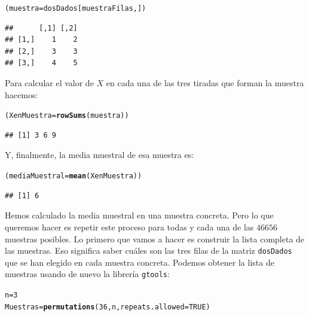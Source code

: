 \documentclass[10pt,a4paper]{article}\usepackage[]{graphicx}\usepackage[]{color}
\makeatletter
\newcommand{\hlnum}[1]{\textcolor[rgb]{0.686,0.059,0.569}{#1}}%
\newcommand{\hlstd}[1]{\textcolor[rgb]{0.345,0.345,0.345}{#1}}%
\newcommand{\hlkwb}[1]{\textcolor[rgb]{0.69,0.353,0.396}{#1}}%
\newcommand{\hlkwc}[1]{\textcolor[rgb]{0.333,0.667,0.333}{#1}}%
\newcommand{\hlkwd}[1]{\textcolor[rgb]{0.737,0.353,0.396}{\textbf{#1}}}%
\newenvironment{kframe}{%
 \def\at@end@of@kframe{}%
 \ifinner\ifhmode%
  \def\at@end@of@kframe{\end{minipage}}%
  \begin{minipage}{\columnwidth}%
 \fi\fi%
 \def\FrameCommand##1{\hskip\@totalleftmargin \hskip-\fboxsep
 \colorbox{shadecolor}{##1}\hskip-\fboxsep
     \hskip-\linewidth \hskip-\@totalleftmargin \hskip\columnwidth}%
 \MakeFramed {\advance\hsize-\width
   \@totalleftmargin\z@ \linewidth\hsize
   \@setminipage}}%
 {\par\unskip\endMakeFramed%
 \at@end@of@kframe}
\newenvironment{knitrout}{}{} %
\makeatother
\begin{document}
\begin{knitrout}
\color{fgcolor}\begin{kframe}
\begin{alltt}
\hlstd{(muestra} \hlkwb{=} \hlstd{dosDados[muestraFilas, ])}
\end{alltt}
\begin{verbatim}
##      [,1] [,2]
## [1,]    1    2
## [2,]    3    3
## [3,]    4    5
\end{verbatim}
\end{kframe}
\end{knitrout}
Para calcular el valor de $X$ en cada una de las tres tiradas que forman la muestra hacemos:
\begin{knitrout}
\color{fgcolor}\begin{kframe}
\begin{alltt}
\hlstd{(XenMuestra} \hlkwb{=} \hlkwd{rowSums}\hlstd{(muestra))}
\end{alltt}
\begin{verbatim}
## [1] 3 6 9
\end{verbatim}
\end{kframe}
\end{knitrout}
Y, finalmente, la media muestral de esa muestra es:
\begin{knitrout}
\color{fgcolor}\begin{kframe}
\begin{alltt}
\hlstd{(mediaMuestral} \hlkwb{=} \hlkwd{mean}\hlstd{(XenMuestra))}
\end{alltt}
\begin{verbatim}
## [1] 6
\end{verbatim}
\end{kframe}
\end{knitrout}
Hemos calculado la media muestral en una muestra concreta. Pero lo que queremos hacer es repetir este proceso para todas y cada una de las $46656$ muestras posibles. Lo primero que vamos a hacer es construir la lista completa de las muestras. Eso significa saber cuáles son las tres filas de la matriz {\tt dosDados} que se han elegido en cada muestra concreta. Podemos obtener la lista de muestras usando de nuevo la librería {\tt gtools}:
\begin{knitrout}
\color{fgcolor}\begin{kframe}
\begin{alltt}
\hlstd{n} \hlkwb{=} \hlnum{3}
\hlstd{Muestras} \hlkwb{=} \hlkwd{permutations}\hlstd{(}\hlnum{36}\hlstd{, n,} \hlkwc{repeats.allowed}\hlstd{=}\hlnum{TRUE}\hlstd{)}
\end{alltt}
\end{kframe}
\end{knitrout}
\end{document}
